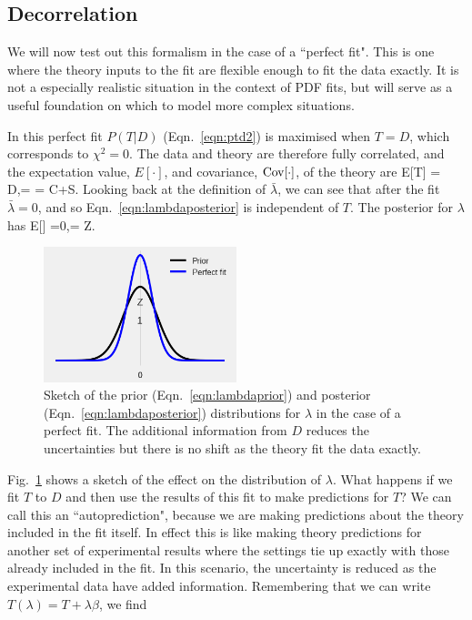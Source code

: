 \subsection{Decorrelation}
We will now test out this formalism in the case of a ``perfect fit". This is one where the theory inputs to the fit are flexible enough to fit the data exactly. It is not a especially realistic situation in the context of PDF fits, but will serve as a useful foundation on which to model more complex situations. 

In this perfect fit $P(T|D)$ (Eqn.~\ref{eqn:ptd2}) is maximised when $T=D$, which corresponds to $\chi^2 = 0$. The data and theory are therefore fully correlated, and the expectation value, $E[\cdot]$, and covariance, ${\rm Cov}[\cdot]$, of the theory are
\be
\label{eq:perfectfit}
E[T] = D,\qquad \Cov[T] = \Cov[D] = C+S.
\ee
Looking back at the definition of $\bar{\lambda}$, we can see that after the fit $\bar{\lambda}=0$, and so Eqn.~\ref{eqn:lambdaposterior} is independent of $T$. The posterior for $\lambda$ has 
\be 
\label{eq:meanvarlam}
E[\lambda] =0,\qquad \Var[\lambda] = Z.
\ee
\begin{figure}[H]
  \begin{center}
      \includegraphics[width=0.5\textwidth]{correlations/plots/lambdaperfectfit.png}
    \caption{Sketch of the prior (Eqn.~\ref{eqn:lambdaprior}) and posterior (Eqn.~\ref{eqn:lambdaposterior}) distributions for $\lambda$ in the case of a perfect fit. The additional information from $D$ reduces the uncertainties but there is no shift as the theory fit the data exactly. \label{fig:lambdaperfect}}
   
  \end{center}
\end{figure}
Fig.~\ref{fig:lambdaperfect} shows a sketch of the effect on the distribution of $\lambda$. What happens if we fit $T$ to $D$ and then use the results of this fit to make predictions for $T$? We can call this an ``autoprediction", because we are making predictions about the theory included in the fit itself. In effect this is like making theory predictions for another set of experimental results where the settings tie up exactly with those already included in the fit. In this scenario, the uncertainty is reduced as the experimental data have added information. Remembering that we can write $T(\lambda) = T + \lambda \beta$, we find
